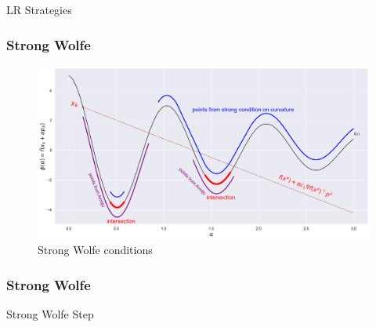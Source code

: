 \documentclass[pdf,10pt]{beamer}
\begin{document}
\begin{section}{LR Strategies}
\begin{frame}
\begin{algorithm}[H]
\begin{algorithmic}[0]
     \end{algorithmic}
   \end{algorithm}
 \end{frame}

 \begin{frame}
   \frametitle{Strong Wolfe}
   \begin{figure}[H]
     \centering
     \includegraphics[width=\textwidth,keepaspectratio]{../data/strong_wolfe.png}
     \caption[Strong Wolfe conditions]{Strong Wolfe conditions}\label{fig:strong_wolfe}
   \end{figure}
 \end{frame}

 \begin{frame}
   \frametitle{Strong Wolfe}
   \begin{algorithm}[H]
     \caption{Strong Wolfe Step}\label{algo:lr_wolfe}
     \begin{algorithmic}[0]

       \State{$\alpha \gets \beta \cdot \alpha$ }
       \If{$\alpha < \epsilon$}
       \State{\Return{$\alpha$}}
       \EndIf{}
       \Else{}
       \State{\Return{$\alpha$}}
       \EndIf{}
       \EndFor{}
       \State{\Return{$\alpha$}}

     \end{algorithmic}
   \end{algorithm}
 \end{frame}





\end{section}
\end{document}
